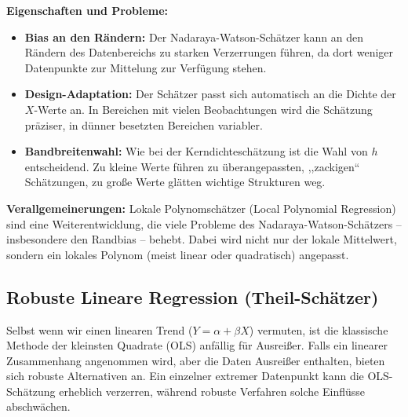 \documentclass[a4paper, 11pt]{scrartcl}
\begin{document}
\textbf{Eigenschaften und Probleme:}
\begin{itemize}
	\item \textbf{Bias an den Rändern:} Der Nadaraya-Watson-Schätzer kann an den Rändern des Datenbereichs zu starken Verzerrungen führen, da dort weniger Datenpunkte zur Mittelung zur Verfügung stehen.
	\item \textbf{Design-Adaptation:} Der Schätzer passt sich automatisch an die Dichte der $X$-Werte an. In Bereichen mit vielen Beobachtungen wird die Schätzung präziser, in dünner besetzten Bereichen variabler.
	\item \textbf{Bandbreitenwahl:} Wie bei der Kerndichteschätzung ist die Wahl von $h$ entscheidend. Zu kleine Werte führen zu überangepassten, ,,zackigen`` Schätzungen, zu große Werte glätten wichtige Strukturen weg.
\end{itemize}

\textbf{Verallgemeinerungen:} Lokale Polynomschätzer (Local Polynomial Regression) sind eine Weiterentwicklung, die viele Probleme des Nadaraya-Watson-Schätzers – insbesondere den Randbias – behebt. Dabei wird nicht nur der lokale Mittelwert, sondern ein lokales Polynom (meist linear oder quadratisch) angepasst.

\subsection{Robuste Lineare Regression (Theil-Schätzer)}

Selbst wenn wir einen linearen Trend ($Y = \alpha + \beta X$) vermuten, ist die klassische Methode der kleinsten Quadrate (OLS) anfällig für Ausreißer. Falls ein linearer Zusammenhang angenommen wird, aber die Daten Ausreißer enthalten, bieten sich robuste Alternativen an. Ein einzelner extremer Datenpunkt kann die OLS-Schätzung erheblich verzerren, während robuste Verfahren solche Einflüsse abschwächen.
\end{document}
